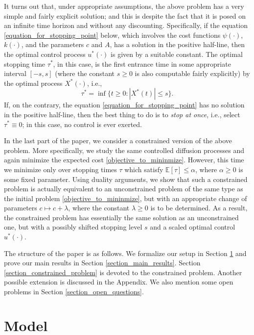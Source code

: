 \documentclass[11pt,tbtags,reqno]{article}
\theoremstyle{definition}
\numberwithin{equation}{section}
\theoremstyle{definition}
\newcommand{\ex}{\mathbb{E}}
\begin{document}
It turns out that, under appropriate assumptions, the above problem has a very simple and fairly explicit solution; and this is despite the fact that it is posed on an infinite time horizon and without any discounting. Specifically, if the equation \eqref{equation_for_stopping_point} below, which involves the cost functions $\psi(\cdot)$, $k(\cdot)$, and the parameters $c$ and $A$,
has a solution in the positive half-line, then the optimal control process $u^*(\cdot)$ is given by a suitable constant. The optimal stopping time $\tau^*$, in this case, is the first entrance time in some appropriate interval $[-s, s]$ (where the constant $s \ge 0$ is also computable fairly explicitly) by the optimal process $X^*(\cdot)$, i.e., 
\begin{equation}
    \tau^* = \inf \{ t \ge 0: |X^*(t)| \le s\}.
\end{equation}
If, on the contrary, the equation \eqref{equation_for_stopping_point} 
has no solution in the positive half-line, then the best thing to do is to \textit{stop at once}, i.e., select $\tau^* \equiv 0$; in this case, no control is ever exerted. 

In the last part of the paper, we consider a constrained version of the above problem. More specifically, we study the same controlled diffusion processes and again minimize the expected cost \eqref{objective_to_mininmize}. However, this time we minimize only over stopping times $\tau$ which satisfy $\ex[\tau] \le \alpha$, where $\alpha \ge 0$ is some fixed parameter. Using duality arguments, we show that such a constrained problem is actually equivalent to an unconstrained problem of the same type as the initial problem \eqref{objective_to_mininmize}, but with an appropriate change of parameters $c \mapsto c + \lambda$, where the constant $\lambda \ge 0$ is to be determined. As a result, the constrained problem has essentially the same solution as an unconstrained one, but with a possibly shifted stopping level $s$ and a scaled optimal control $u^*(\cdot)$.

The structure of the paper is as follows. We formalize our setup in Section \ref{section_model} and prove our main results in Section \ref{section_main_results}. Section \ref{section_constrained_problem} is devoted to the constrained problem. Another possible extension is discussed in the Appendix. We also mention some open problems in Section \ref{section_open_questions}.

\section{Model}\label{section_model}
\end{document}
